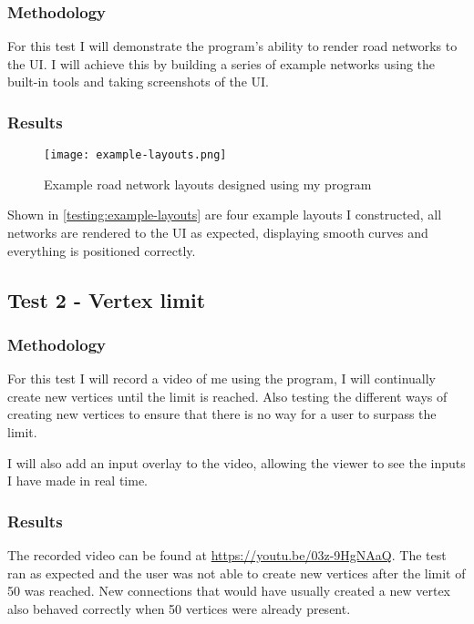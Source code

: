         \subsubsection{Methodology}

            For this test I will demonstrate the program's ability to render road networks to the UI. I will achieve this by building a series of example networks using the built-in tools and taking screenshots of the UI.

        \subsubsection{Results}

            \begin{figure}[ht]
                \centering
                \texttt{[image: example-layouts.png]}
                \caption{Example road network layouts designed using my program}
                \label{testing:example-layouts}
            \end{figure}

            Shown in \autoref{testing:example-layouts} are four example layouts I constructed, all networks are rendered to the UI as expected, displaying smooth curves and everything is positioned correctly.

    \subsection{Test 2 - Vertex limit}
    \label{testing:t2}

        \subsubsection{Methodology}

            For this test I will record a video of me using the program, I will continually create new vertices until the limit is reached. Also testing the different ways of creating new vertices to ensure that there is no way for a user to surpass the limit.

            I will also add an input overlay to the video, allowing the viewer to see the inputs I have made in real time.

        \subsubsection{Results}

            The recorded video can be found at \href{https://youtu.be/03z-9HgNAaQ}{https://youtu.be/03z-9HgNAaQ}. The test ran as expected and the user was not able to create new vertices after the limit of 50 was reached. New connections that would have usually created a new vertex also behaved correctly when 50 vertices were already present.

